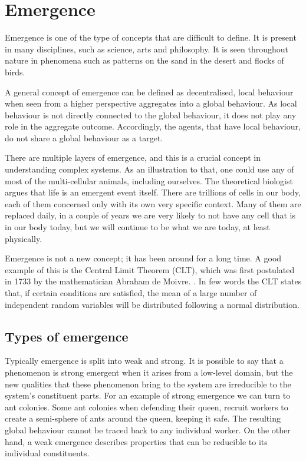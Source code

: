 \section{Emergence}

Emergence is one of the type of concepts that are difficult to define. It is present in many disciplines, such as science, arts and philosophy. It is seen throughout nature in phenomena such as patterns on the sand in the desert and flocks of birds.

A general concept of emergence can be defined as decentralised, local behaviour when seen from a higher perspective aggregates into a global behaviour. As local behaviour is not directly connected to the global behaviour, it does not play any role in the aggregate outcome. Accordingly, the agents, that have local behaviour, do not share a global behaviour as a target.

There are multiple layers of emergence, and this is a crucial concept in understanding complex systems.\cite{miller2007complex} As an illustration to that, one could use any of most of the multi-cellular animals, including ourselves. The theoretical biologist \citeauthor{life1010034} argues that life is an emergent event itself. There are trillions of cells in our body, each of them concerned only with its own very specific context. Many of them are replaced daily, in a couple of years we are very likely to not have any cell that is in our body today, but we will continue to be what we are today, at least physically.

Emergence is not a new concept; it has been around for a long time. A good example of this is the Central Limit Theorem (CLT), which was first postulated in 1733 by the mathematician Abraham de Moivre. \cite{tijms2007understanding}. In few words the CLT states that, if certain conditions are satisfied, the mean of a large number of independent random variables will be distributed following a normal distribution.

\subsection{Types of emergence}

Typically emergence is split into weak and strong. It is possible to say that a phenomenon is strong emergent when it arises from a low-level domain, but the new qualities that these phenomenon bring to the system are irreducible to the system's constituent parts.\cite{laughlin2008different} For an example of strong emergence we can turn to ant colonies. Some ant colonies when defending their queen, recruit workers to create a semi-sphere of ants around the queen, keeping it safe. The resulting global behaviour cannot be traced back to any individual worker. On the other hand, a weak emergence describes properties that can be reducible to its individual constituents. 

